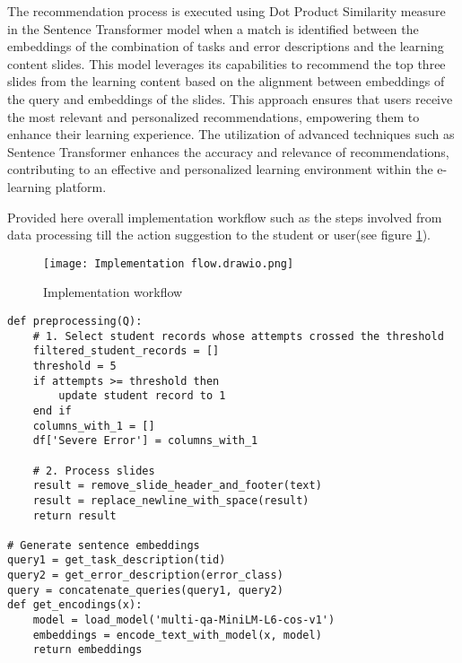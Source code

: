 \documentclass[conference]{IEEEtran}
\begin{document}
{{The recommendation process is executed using Dot Product Similarity measure in the Sentence Transformer model when a match is identified between the embeddings of the combination of tasks and error descriptions and the learning content slides. This model leverages its capabilities to recommend the top three slides from the learning content based on the alignment between embeddings of the query and embeddings of the slides. This approach ensures that users receive the most relevant and personalized recommendations, empowering them to enhance their learning experience. The utilization of advanced techniques such as Sentence Transformer enhances the accuracy and relevance of recommendations, contributing to an effective and personalized learning environment within the e-learning platform.

Provided here overall implementation workflow such as the steps involved from data processing till the action suggestion to the student or user(see figure \ref{IF}).

\begin{figure}[ht!] %
\centering
\texttt{[image: Implementation flow.drawio.png]}
\caption{Implementation workflow}
\label{IF}
\end{figure}

\newpage
{}

\begin{lstlisting}[caption={Pseudocode 1: Algorithm for Data Preprocessing, Action/Suggestion Generation}, captionpos=b, label = L_4_1]
def preprocessing(Q):
    # 1. Select student records whose attempts crossed the threshold
    filtered_student_records = []
    threshold = 5
    if attempts >= threshold then
        update student record to 1
    end if
    columns_with_1 = []
    df['Severe Error'] = columns_with_1

    # 2. Process slides
    result = remove_slide_header_and_footer(text)
    result = replace_newline_with_space(result)
    return result

# Generate sentence embeddings
query1 = get_task_description(tid)
query2 = get_error_description(error_class)
query = concatenate_queries(query1, query2)
def get_encodings(x):
    model = load_model('multi-qa-MiniLM-L6-cos-v1')
    embeddings = encode_text_with_model(x, model)
    return embeddings


\end{lstlisting}}}
\end{document}
